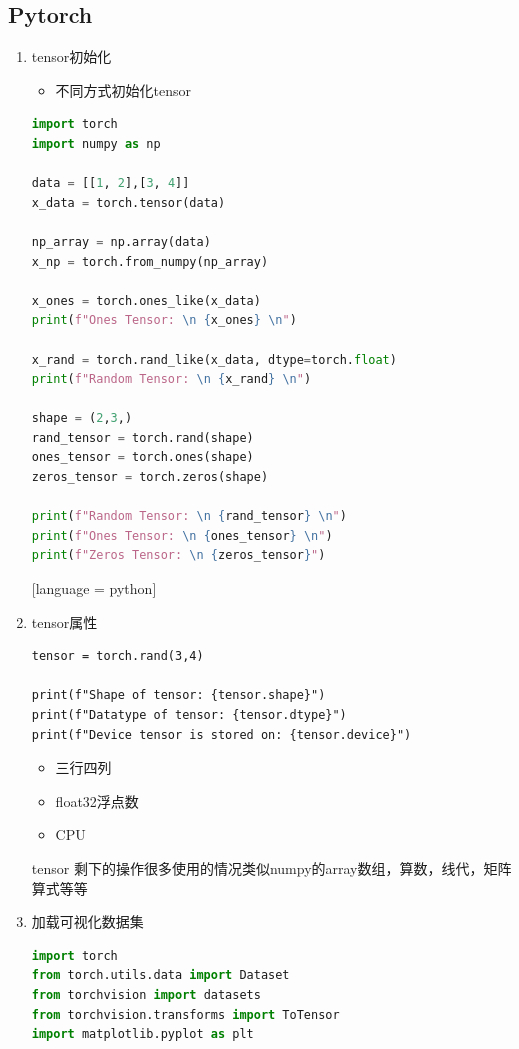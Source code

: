 \documentclass[a4paper, 12pt]{article}
\begin{document}
\subsection{Pytorch}
\begin{enumerate}
  \item{\large tensor初始化}
    \begin{itemize}
        \item 不同方式初始化tensor
    \end{itemize}
    \begin{lstlisting}[language = python]
import torch
import numpy as np

data = [[1, 2],[3, 4]]
x_data = torch.tensor(data)

np_array = np.array(data)
x_np = torch.from_numpy(np_array)

x_ones = torch.ones_like(x_data)
print(f"Ones Tensor: \n {x_ones} \n")

x_rand = torch.rand_like(x_data, dtype=torch.float) 
print(f"Random Tensor: \n {x_rand} \n")

shape = (2,3,)
rand_tensor = torch.rand(shape)
ones_tensor = torch.ones(shape)
zeros_tensor = torch.zeros(shape)

print(f"Random Tensor: \n {rand_tensor} \n")
print(f"Ones Tensor: \n {ones_tensor} \n")
print(f"Zeros Tensor: \n {zeros_tensor}")
    \end{lstlisting}[language = python]
  \item{\large tensor属性}
    \begin{lstlisting}
tensor = torch.rand(3,4)

print(f"Shape of tensor: {tensor.shape}")
print(f"Datatype of tensor: {tensor.dtype}")
print(f"Device tensor is stored on: {tensor.device}")
    \end{lstlisting}
    \begin{itemize}
        \item 三行四列
        \item float32浮点数
        \item CPU
    \end{itemize}
    tensor 剩下的操作很多使用的情况类似numpy的array数组，算数，线代，矩阵算式等等\\
  \item{\large 加载可视化数据集}
    \begin{lstlisting}[language = python]
import torch
from torch.utils.data import Dataset
from torchvision import datasets
from torchvision.transforms import ToTensor
import matplotlib.pyplot as plt



\end{lstlisting}
\end{enumerate}
\end{document}
